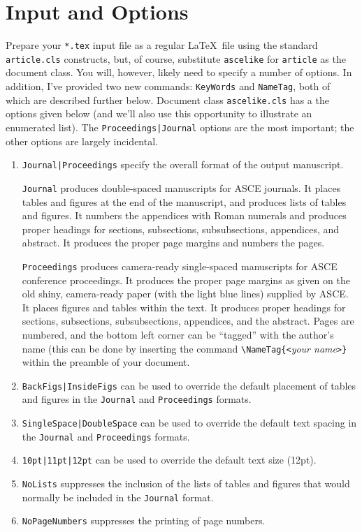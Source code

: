 \documentclass[Proceedings]{ascelike}
\begin{document}
\section{Input and Options}
Prepare your \verb+*.tex+ input file as a regular
\LaTeX\ file using the standard \texttt{article.cls} constructs,
but, of course, substitute \texttt{ascelike} for \texttt{article}
as the document class.
You will, however, likely need to specify a number of options.
In addition, I've provided two new commands: \verb+KeyWords+ and
\verb+NameTag+, both of which are described further below.
Document class \texttt{ascelike.cls} has a the options given
below (and we'll also use this opportunity to illustrate an enumerated list).
The \verb+Proceedings|+\-\verb+Journal+ options are the most important;
the other options are largely incidental.
%
\begin{enumerate}
\item
\verb+Journal|+\verb+Proceedings+ specify the overall format
of the output man\-u\-script.  
\par
\texttt{Journal} produces double-spaced manuscripts for ASCE journals.
It places tables and figures at the end of the manuscript, 
and produces lists of tables and figures.  
It numbers the appendices with Roman numerals and produces 
proper headings for
sections, subsections, subsubsections, appendices, and abstract.
It produces the proper page margins and numbers the pages.
\par
\texttt{Proceedings} produces camera-ready single-spaced manuscripts
for ASCE conference proceedings.  
It produces the proper page margins as
given on the old shiny, 
camera-ready paper (with the light blue lines) 
supplied by ASCE. 
It places figures and tables
within the text.  It produces proper headings for
sections, subsections, subsubsections, appendices, and the abstract.
Pages are numbered, and the bottom left corner can be ``tagged'' with
the author's name (this can be done by inserting the command
\verb+\NameTag{<+\emph{your name}\verb+>}+ within the preamble of your
document.
\item
\verb+BackFigs|InsideFigs+ can be used to override 
the default placement of tables
and figures in the \texttt{Journal} and \texttt{Proceedings} formats.
\item
\verb+SingleSpace|DoubleSpace+ can be used to override 
the default text spacing in the 
\texttt{Journal} and \texttt{Proceedings} formats.
\item
\verb+10pt|11pt|12pt+ can be used to override the 
default text size (12pt).
\item
\texttt{NoLists} suppresses the inclusion of the lists of tables
and figures that would normally be included in the \texttt{Journal}
format.
\item
\texttt{NoPageNumbers} suppresses the printing of page numbers.
\end{enumerate}
%
\end{document}
